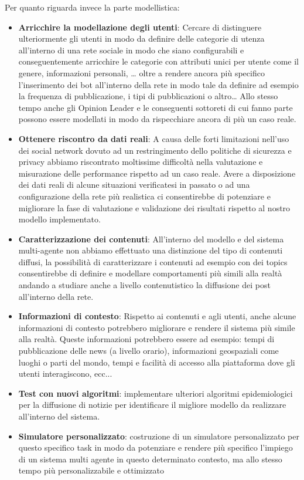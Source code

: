 \documentclass[11pt]{article}
\begin{document}
Per quanto riguarda invece la parte modellistica:

\begin{itemize}
    \item \textbf{Arricchire la modellazione degli utenti}: Cercare di distinguere ulteriormente gli utenti in modo da definire delle categorie di utenza all'interno di una rete sociale in modo che siano configurabili e conseguentemente arricchire le categorie con attributi unici per utente come il genere, informazioni personali, … oltre a rendere ancora più specifico l'inserimento dei bot all'interno della rete in modo tale da definire ad esempio la frequenza di pubblicazione, i tipi di pubblicazioni o altro… Allo stesso tempo anche gli Opinion Leader e le conseguenti sottoreti di cui fanno parte possono essere modellati in modo da rispecchiare ancora di più un caso reale.
    \item \textbf{Ottenere riscontro da dati reali}: A causa delle forti limitazioni nell'uso dei social network dovuto ad un restringimento dello politiche di sicurezza e privacy abbiamo riscontrato moltissime difficoltà nella valutazione e misurazione delle performance rispetto ad un caso reale. Avere a disposizione dei dati reali di alcune situazioni verificatesi in passato o ad una configurazione della rete più realistica ci consentirebbe di potenziare e migliorare la fase di valutazione e validazione dei risultati rispetto al nostro modello implementato.
    \item \textbf{Caratterizzazione dei contenuti}: All'interno del modello e del sistema multi-agente non abbiamo effettuato una distinzione del tipo di contenuti diffusi, la possibilità di caratterizzare i contenuti ad esempio con dei topics consentirebbe di definire e modellare comportamenti più simili alla realtà andando a studiare anche a livello contenutistico la diffusione dei post all'interno della rete.
    \item \textbf{Informazioni di contesto}: Rispetto ai contenuti e agli utenti, anche alcune informazioni di contesto potrebbero migliorare e rendere il sistema più simile alla realtà. Queste informazioni potrebbero essere ad esempio: tempi di pubblicazione delle news (a livello orario), informazioni geospaziali come luoghi o parti del mondo, tempi e facilità di accesso alla piattaforma dove gli utenti interagiscono, ecc...
    \item \textbf{Test con nuovi algoritmi}: implementare ulteriori algoritmi epidemiologici per la diffusione di notizie per identificare il migliore modello da realizzare all'interno del sistema.
    \item \textbf{Simulatore personalizzato}: costruzione di un simulatore personalizzato per questo specifico task in modo da potenziare e rendere più specifico l'impiego di un sistema multi agente in questo determinato contesto, ma allo stesso tempo più personalizzabile e ottimizzato
\end{itemize}



\end{document}
